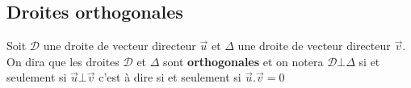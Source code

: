 \documentclass[french]{book}
\newcommand{\cald}{\mathscr{D}}
\newcommand{\ve}[1]{\overrightarrow{#1}}
\newcommand{\ps}[2]{\overrightarrow{#1}.\overrightarrow{#2}}
\newcommand{\la}{\lambda}
\newcommand{\DR}{\cald}
\begin{document}

\subsection{Droites orthogonales}

\begin{defn}
  Soit $\DR$ une droite de vecteur directeur $\ve{u}$ et $\Delta$ une droite de vecteur directeur $\ve{v}$. \\
On dira que les droites  $\DR$ et $\Delta$ sont \textbf{orthogonales} et
on notera $\DR\bot\Delta$ si  et seulement si $\ve{u}\bot\ve{v}$ c'est à
dire si et seulement si $\ps{u}{v}=0$
\end{defn}
\end{document}
